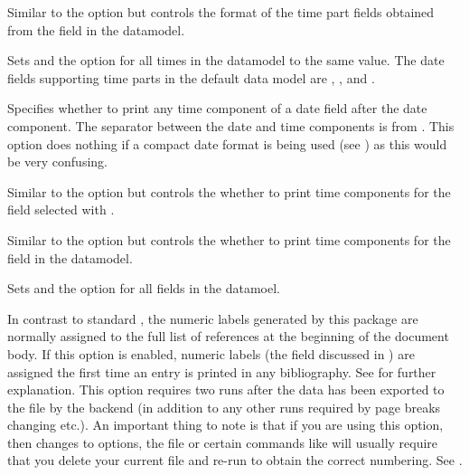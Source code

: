 \documentclass{ltxdockit}[2011/03/25]
\begin{document}
\begin{optionlist}

Similar to the  option but controls the format of the time part fields obtained from the  field in the datamodel.


Sets  and the  option for all times in the datamodel to the same value. The date fields supporting time parts in the default data model are , ,  and .


Specifies whether to print any time component of a date field after the date component. The separator between the date and time components is  from . This option does nothing if a compact date format is being used (see ) as this would be very confusing.


Similar to the  option but controls the whether to print time components for the field selected with .


Similar to the  option but controls the whether to print time components for the  field in the datamodel.


Sets  and the  option for all  fields in the datamoel.


In contrast to standard \latex, the numeric labels generated by this package are normally assigned to the full list of references at the beginning of the document body. If this option is enabled, numeric labels (\ie the  field discussed in ) are assigned the first time an entry is printed in any bibliography. See  for further explanation.  This option requires two \latex runs after the data has been exported to the  file by the backend (in addition to any other runs required by page breaks changing etc.). An important thing to note is that if you are using this option, then changes to options, the  file or certain commands like  will usually require that you delete your current  file and re-run \latex to obtain the correct numbering. See .


\end{optionlist}
\end{document}
